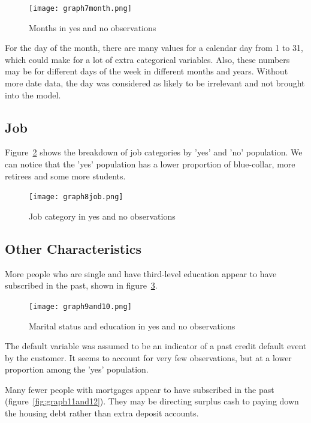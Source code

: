 \documentclass[9pt,technote]{IEEEtran}
\begin{document}
\begin{figure}[htbp]
\centerline{\texttt{[image: graph7month.png]}}
\caption{Months in yes and no observations}
\label{fig:graph7month}
\end{figure}

For the day of the month, there are many values for a calendar day from 1 to 31, which could make for a lot of extra categorical variables.  Also, these numbers may be for different days of the week in different months and years.  Without more date data, the day was considered as likely to be irrelevant and not brought into the model.   

\subsection{Job}

Figure~\ref{fig:graph8job} shows the breakdown of job categories by 'yes' and 'no' population.  We can notice that the 'yes' population has a lower proportion of blue-collar, more retirees and some more students.   

\begin{figure}[htbp]
\centerline{\texttt{[image: graph8job.png]}}
\caption{Job category in yes and no observations}
\label{fig:graph8job}
\end{figure}

\subsection{Other Characteristics}

More people who are single and have third-level education appear to have subscribed in the past, shown in figure~\ref{fig:graph9and10}.  

\begin{figure}[htbp]
\centerline{\texttt{[image: graph9and10.png]}}
\caption{Marital status and education in yes and no observations}
\label{fig:graph9and10}
\end{figure}

The default variable was assumed to be an indicator of a past credit default event by the customer.  It seems to account for very few observations, but at a lower proportion among the 'yes' population.  

Many fewer people with mortgages appear to have subscribed in the past (figure~\ref{fig:graph11and12}).  They may be directing surplus cash to paying down the housing debt rather than extra deposit accounts.  
\end{document}
